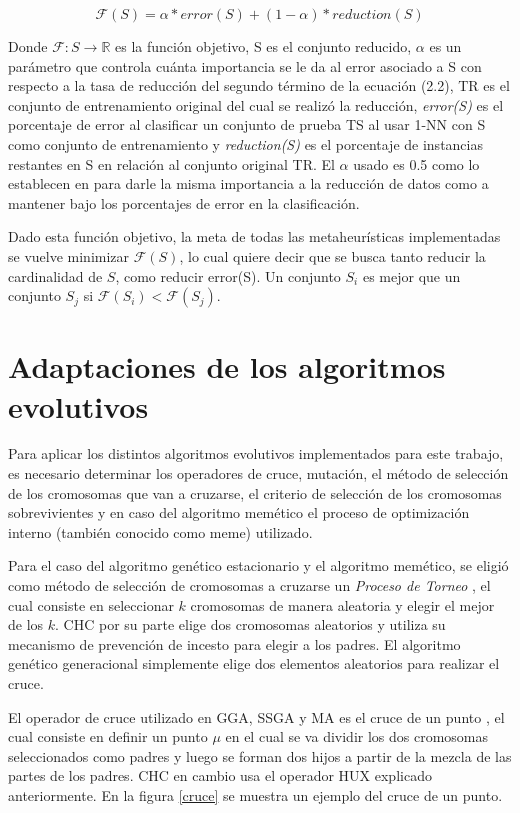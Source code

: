 \begin{equation}
\mathcal{F}(S) = \alpha * error(S) + (1 - \alpha) * reduction(S)
\end{equation} 

Donde $\mathcal{F}: S \rightarrow \mathbb{R}$ es la función objetivo, S es el conjunto reducido, $\alpha$ es un parámetro que controla cuánta importancia se le da al error asociado a S con respecto a la tasa de reducción del segundo término de la ecuación (2.2), TR es el conjunto de entrenamiento original del cual se realizó la reducción, \emph{error(S)} es el porcentaje de error al clasificar un conjunto de prueba TS al usar 1-NN con S como conjunto de entrenamiento y \emph{reduction(S)} es el porcentaje de instancias restantes en S en relación al conjunto original TR. El $\alpha$ usado es 0.5 como lo establecen en \cite{de2004reduccion} para darle la misma importancia a la reducción de datos como a mantener bajo los porcentajes de error en la clasificación.

Dado esta función objetivo, la meta de todas las metaheurísticas implementadas se vuelve minimizar $\mathcal{F}(S)$, lo cual quiere decir que se busca tanto reducir la cardinalidad de $S$, como reducir error(S). Un conjunto $S_i$ es mejor que un conjunto $S_j$ si $\mathcal{F}(S_i) < \mathcal{F}(S_j)$.  

\section{Adaptaciones de los algoritmos evolutivos}

Para aplicar los distintos algoritmos evolutivos implementados para este trabajo, es necesario determinar los operadores de cruce, mutación, el método de selección de los cromosomas que van a cruzarse, el criterio de selección de los cromosomas sobrevivientes y en caso del algoritmo memético el proceso de optimización interno (también conocido como meme) utilizado.

Para el caso del algoritmo genético estacionario y el algoritmo memético, se eligió como método de selección de cromosomas a cruzarse un \emph{Proceso de Torneo} \cite{talbi2009metaheuristics}, el cual consiste en seleccionar $k$ cromosomas de manera aleatoria y elegir el mejor de los $k$. CHC por su parte elige dos cromosomas aleatorios y utiliza su mecanismo de prevención de incesto para elegir a los padres. El algoritmo genético generacional simplemente elige dos elementos aleatorios para realizar el cruce.

El operador de cruce utilizado en GGA, SSGA y MA es el cruce de un punto \cite{talbi2009metaheuristics}, el cual consiste en definir un punto $\mu$ en el cual se va dividir los dos cromosomas seleccionados como padres y luego se forman dos hijos a partir de la mezcla de las partes de los padres. CHC en cambio usa el operador HUX explicado anteriormente. En la figura \ref{cruce} se muestra un ejemplo del cruce de un punto. 

